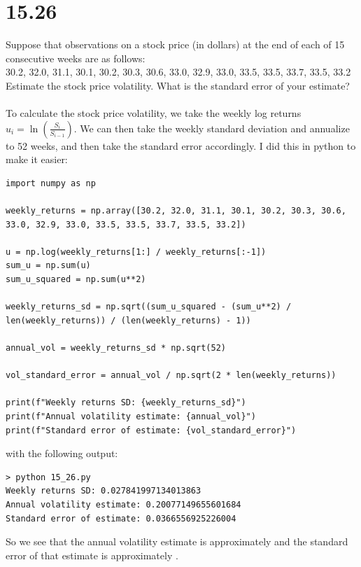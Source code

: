 \documentclass{article}
\begin{document}
{\Large 

\section*{15.26}
Suppose that observations on a stock price (in dollars) at the end of each of 15 consecutive weeks are as follows: \\
30.2, 32.0, 31.1, 30.1, 30.2, 30.3, 30.6, 33.0, 32.9, 33.0, 33.5, 33.5, 33.7, 33.5, 33.2 \\
Estimate the stock price volatility. What is the standard error of your estimate? \\ \\
To calculate the stock price volatility, we take the weekly log returns \(u_i = \ln(\frac{S_i}{S_{i-1}})\). We can then take the weekly standard deviation and annualize to 52 weeks, and then take the standard error accordingly. I did this in python to make it easier:
\begin{verbatim}
import numpy as np

weekly_returns = np.array([30.2, 32.0, 31.1, 30.1, 30.2, 30.3, 30.6, 33.0, 32.9, 33.0, 33.5, 33.5, 33.7, 33.5, 33.2])

u = np.log(weekly_returns[1:] / weekly_returns[:-1])
sum_u = np.sum(u)
sum_u_squared = np.sum(u**2)

weekly_returns_sd = np.sqrt((sum_u_squared - (sum_u**2) / len(weekly_returns)) / (len(weekly_returns) - 1))

annual_vol = weekly_returns_sd * np.sqrt(52)

vol_standard_error = annual_vol / np.sqrt(2 * len(weekly_returns))

print(f"Weekly returns SD: {weekly_returns_sd}")
print(f"Annual volatility estimate: {annual_vol}")
print(f"Standard error of estimate: {vol_standard_error}")
\end{verbatim}

with the following output:

\begin{verbatim}
> python 15_26.py
Weekly returns SD: 0.027841997134013863
Annual volatility estimate: 0.20077149655601684
Standard error of estimate: 0.0366556925226004
\end{verbatim}
So we see that the annual volatility estimate is approximately  and the standard error of that estimate is approximately .


}
\end{document}
